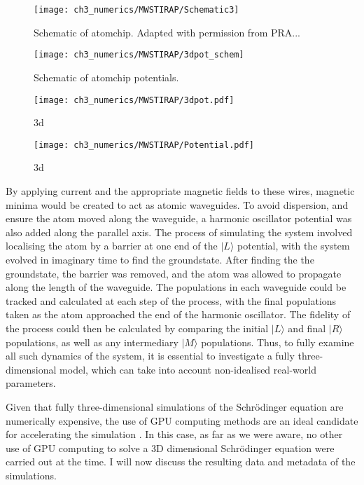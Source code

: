 \begin{figure}[tb]
    \centering
  \texttt{[image: ch3\_numerics/MWSTIRAP/Schematic3]}
  \caption{Schematic of atomchip. Adapted with permission from PRA...}
  \label{fig:schematic}
\end{figure}
\begin{figure}[tb]
    \centering
  \texttt{[image: ch3\_numerics/MWSTIRAP/3dpot\_schem]}
  \caption{Schematic of atomchip potentials.}

  \label{fig:potschematic}
\end{figure}




\begin{figure}[tb]
    \centering
  \texttt{[image: ch3\_numerics/MWSTIRAP/3dpot.pdf]}
  \caption{3d}
  \label{fig:Populations}
\end{figure}

\begin{figure}[tb]
    \centering
  \texttt{[image: ch3\_numerics/MWSTIRAP/Potential.pdf]}
  \caption{3d}
  \label{fig:potential}
\end{figure}








By applying current and the appropriate magnetic fields to these wires, magnetic minima would be created to act as atomic waveguides. To avoid dispersion, and ensure the atom moved along the waveguide, a harmonic oscillator potential was also added along the parallel axis. The process of simulating the system involved localising the atom by a barrier at one end of the $|L\rangle$ potential, with the system evolved in imaginary time to find the groundstate. After finding the the groundstate, the barrier was removed, and the atom was allowed to propagate along the length of the waveguide. The populations in each waveguide could be tracked and calculated at each step of the process, with the final populations taken as the atom approached the end of the harmonic oscillator. The fidelity of the process could then be calculated by comparing the initial $| L \rangle$ and final $|R \rangle$ populations, as well as any intermediary $| M \rangle$ populations. Thus, to fully examine all such dynamics of the system, it is essential to investigate a fully three-dimensional model, which can take into account non-idealised real-world parameters.

Given that fully three-dimensional simulations of the Schr\"odinger equation are numerically expensive, the use of GPU computing methods are an ideal candidate for accelerating the simulation \cite{Bauke:11}. In this case, as far as we were aware, no other use of GPU computing to solve a 3D dimensional Schr\"odinger equation were carried out at the time. I will now discuss the resulting data and metadata of the simulations.


